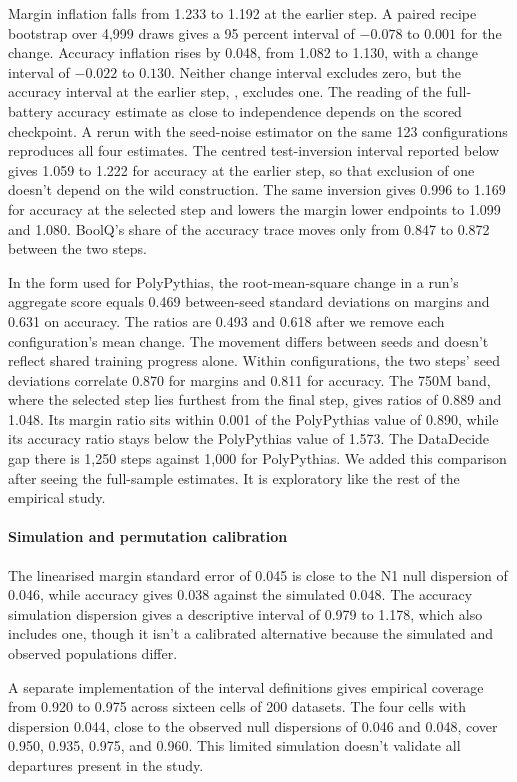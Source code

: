Margin inflation falls from 1.233 to 1.192 at the earlier step. A paired recipe bootstrap over 4,999 draws gives a 95 percent interval of $-0.078$ to $0.001$ for the change. Accuracy inflation rises by 0.048, from 1.082 to 1.130, with a change interval of $-0.022$ to $0.130$. Neither change interval excludes zero, but the accuracy interval at the earlier step, , excludes one. The reading of the full-battery accuracy estimate as close to independence depends on the scored checkpoint. A rerun with the seed-noise estimator on the same 123 configurations reproduces all four estimates. The centred test-inversion interval reported below gives 1.059 to 1.222 for accuracy at the earlier step, so that exclusion of one doesn't depend on the wild construction. The same inversion gives 0.996 to 1.169 for accuracy at the selected step and lowers the margin lower endpoints to 1.099 and 1.080. BoolQ's share of the accuracy trace moves only from 0.847 to 0.872 between the two steps.

In the form used for PolyPythias, the root-mean-square change in a run's aggregate score equals 0.469 between-seed standard deviations on margins and 0.631 on accuracy. The ratios are 0.493 and 0.618 after we remove each configuration's mean change. The movement differs between seeds and doesn't reflect shared training progress alone. Within configurations, the two steps' seed deviations correlate 0.870 for margins and 0.811 for accuracy. The 750M band, where the selected step lies furthest from the final step, gives ratios of 0.889 and 1.048. Its margin ratio sits within 0.001 of the PolyPythias value of 0.890, while its accuracy ratio stays below the PolyPythias value of 1.573. The DataDecide gap there is 1,250 steps against 1,000 for PolyPythias. We added this comparison after seeing the full-sample estimates. It is exploratory like the rest of the empirical study.

\paragraph{Simulation and permutation calibration}\label{app:calibration}
The linearised margin standard error of 0.045 is close to the N1 null dispersion of 0.046, while accuracy gives 0.038 against the simulated 0.048. The accuracy simulation dispersion gives a descriptive interval of 0.979 to 1.178, which also includes one, though it isn't a calibrated alternative because the simulated and observed populations differ.

A separate implementation of the interval definitions gives empirical coverage from 0.920 to 0.975 across sixteen cells of 200 datasets. The four cells with dispersion 0.044, close to the observed null dispersions of 0.046 and 0.048, cover 0.950, 0.935, 0.975, and 0.960. This limited simulation doesn't validate all departures present in the study.


